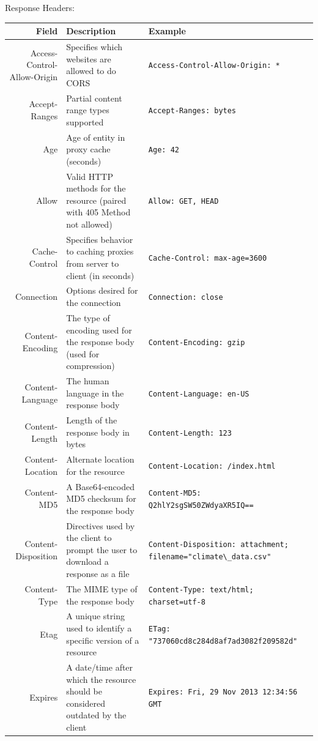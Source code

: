 \documentclass[final]{beamer}
\newcommand{\header}[1]{\texttt{\lstinline!#1!}}
\begin{document}
\begin{frame}{}
\begin{columns}
\begin{column}{0.4\textwidth}
\begin{block}{\huge{Response Headers:}}
          \footnotesize
          \begin{tabular}{r p{} p{}}
            Field & Description & Example \\ \hline
            Access-Control-Allow-Origin & Specifies which websites are allowed to do CORS & \header{Access-Control-Allow-Origin: * } \\
            Accept-Ranges & Partial content range types supported & \header{Accept-Ranges: bytes } \\
            Age & Age of entity in proxy cache (seconds) & \header{Age: 42 } \\
            Allow & Valid HTTP methods for the resource (paired with 405 Method not allowed) & \header{Allow: GET, HEAD } \\
            Cache-Control & Specifies behavior to caching proxies from server to client (in seconds) & \header{Cache-Control: max-age=3600 } \\
            Connection & Options desired for the connection & \header{Connection: close } \\
            Content-Encoding & The type of encoding used for the response body (used for compression) & \header{Content-Encoding: gzip } \\
            Content-Language & The human language in the response body & \header{Content-Language: en-US } \\
            Content-Length & Length of the response body in bytes & \header{Content-Length: 123 } \\
            Content-Location & Alternate location for the resource & \header{Content-Location: /index.html } \\
            Content-MD5 & A Base64-encoded MD5 checksum for the response body & \header{Content-MD5: Q2hlY2sgSW50ZWdyaXR5IQ== } \\
            Content-Disposition & Directives used by the client to prompt the user to download a response as a file & \header{Content-Disposition: attachment;} \header{filename="climate\_data.csv" } \\
            Content-Type & The MIME type of the response body & \header{Content-Type: text/html; charset=utf-8 } \\
            Etag & A unique string used to identify a specific version of a resource & \header{ETag: "737060cd8c284d8af7ad3082f209582d" } \\
            Expires & A date/time after which the resource should be considered outdated by the client & \header{Expires: Fri, 29 Nov 2013 12:34:56 GMT } \\

\end{tabular}
\end{block}
\end{column}
\end{columns}
\end{frame}
\end{document}

